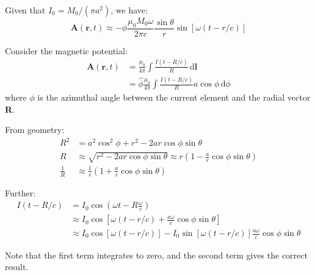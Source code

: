\documentclass[12pt]{article}
\begin{document}
Given that $I_{0} = M_{0}/(\pi a^{2})$, we have:
\begin{equation}
    \mathbf{A}(\mathbf{r}, t) \approx -\hat{\phi} \frac{\mu_{0} M_{0} \omega}{2\pi c} \frac{\sin{\theta}}{r} \sin{\left[ \omega (t - r/c) \right]}
\end{equation}

\begin{correction}
    Consider the magnetic potential:
    \begin{equation}
        \begin{split}
            \mathbf{A}(\mathbf{r}, t) &= \frac{\mu_{0}}{4\pi} \int \frac{I(t - R/c)}{R} \, \mathrm{d}\mathbf{l} \\
            &= \hat{\phi} \frac{\mu_{0}}{4\pi} \int \frac{I(t - R/c)}{R} a \cos{\phi} \, \mathrm{d}\phi
        \end{split}
    \end{equation}
    where $\phi$ is the azimuthal angle between the current element and the radial vector $\mathbf{R}$.

    From geometry:
    \begin{equation}
        \begin{split}
            R^{2} &= a^{2} \cos^{2}{\phi} + r^{2} - 2ar \cos{\phi} \sin{\theta} \\
            R &\approx \sqrt{r^{2} - 2ar \cos{\phi} \sin{\theta}} \approx r \left( 1 - \frac{a}{r} \cos{\phi} \sin{\theta} \right) \\
            \frac{1}{R} &\approx \frac{1}{r} \left( 1 + \frac{a}{r} \cos{\phi} \sin{\theta} \right)
        \end{split}
    \end{equation}

    Further:
    \begin{equation}
        \begin{split}
            I(t - R/c) &= I_{0} \cos{\left( \omega t - R \frac{\omega}{c} \right)} \\
            &\approx I_{0} \cos{\left[ \omega (t - r/c) + \frac{a\omega}{c} \cos{\phi} \sin{\theta} \right]} \\
            &\approx I_{0} \cos{\left[ \omega (t - r/c) \right]} - I_{0} \sin{\left[ \omega (t - r/c) \right]} \frac{a \omega}{c} \cos{\phi} \sin{\theta}
        \end{split}
    \end{equation}

    Note that the first term integrates to zero, and the second term gives the correct result.
\end{correction}
\end{document}
